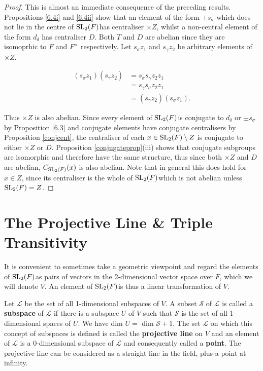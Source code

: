 \begin{proof} This is almost an immediate consequence of the preceding results. Propositions \ref{6.4i} and \ref{6.4ii} show that an element of the form $\pm s_\sigma$ which does not lie in the centre of $\operatorname{SL}_2(F)$has centraliser $\times Z$, whilst a non-central element of the form $d_\delta$ has centraliser $D$. Both $T$ and $D$ are abelian since they are isomoprhic to $F$ and $F^\times$ respectively. Let $s_\sigma z_1$ and $s_\gamma z_2$  be arbitrary elements of $\times Z$.

\vspace{-.5mm}
\begin{align*} (s_\sigma z_1)(s_\gamma z_2)  &= s_\sigma s_\gamma z_2 z_1  \tag{since  $z_1 \in Z$}
\\ &= s_\gamma s_\sigma z_2 z_1  \tag{since  $T$ is abelian}
\\ &= (s_\gamma z_2)(s_\sigma z_1).   \tag{since  $z_2 \in Z$}
\end {align*} 

Thus $\times Z$ is also abelian. Since every element of $\operatorname{SL}_2(F)$is conjugate to $d_\delta$ or $\pm s_\sigma$ by Proposition \ref{6.3} and conjugate elements have conjugate centralisers by Proposition \ref{conjcent}, the centraliser of each $x \in \operatorname{SL}_2(F)\setminus Z$ is conjugate to either $\times Z$ or $D$. Proposition \ref{conjugateprop}(iii) shows that conjugate subgroups are isomorphic and therefore have the same structure, thus since both $\times Z$ and $D$ are abelian, $C_{\operatorname{SL}_2(F)}(x)$ is also abelian. Note that in general this does hold for $x \in Z$, since its centraliser is the whole of $\operatorname{SL}_2(F)$which is not abelian unless $\operatorname{SL}_2(F)= Z$.

\end{proof}

\section{The Projective Line \& Triple Transitivity}

It is convenient to sometimes take a geometric viewpoint and regard the elements of $\operatorname{SL}_2(F)$as pairs of vectors in the 2-dimensional vector space over $F$, which we will denote $V$. An element of $\operatorname{SL}_2(F)$is thus a linear transformation of $V$. 

\begin{definition} Let $\mathscr{L}$ be the set of all 1-dimensional subspaces of $V$. A subset $\mathscr{S}$ of $\mathscr{L}$ is called a \textbf{subspace} of $\mathscr{L}$ if there is a subspace $U$ of $V$ such that $\mathscr{S}$ is the set of all 1-dimensional spaces of $U$. We have dim $U =$ dim $\mathscr{S} + 1$. The set $\mathscr{L}$ on which this concept of subspaces is defined is called the \textbf{projective line} on $V$ and an element of $\mathscr{L}$ is a 0-dimensional subspace of $\mathscr{L}$ and consequently called a \textbf{point}. The projective line can be considered as a straight line in the field, plus a point at infinity.
\end{definition}

